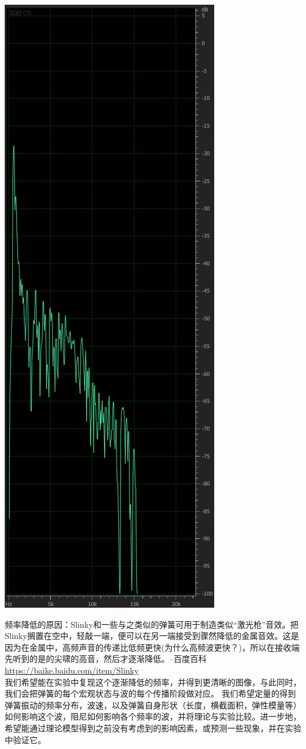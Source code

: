 \documentclass[UTF8,9pt]{report}
\begin{document}
\begin{center}
        \includegraphics[scale=0.4]{1_21.png}
    \end{center}
    频率降低的原因：Slinky和一些与之类似的弹簧可用于制造类似“激光枪”音效。把Slinky搁置在空中，轻敲一端，便可以在另一端接受到骤然降低的金属音效。这是因为在金属中，高频声音的传递比低频更快{\color{red}(为什么高频波更快？)}，所以在接收端先听到的是的尖啸的高音，然后才逐渐降低。--百度百科\url{https://baike.baidu.com/item/Slinky} \\
    我们希望能在实验中复现这个逐渐降低的频率，并得到更清晰的图像，与此同时，我们会把弹簧的每个宏观状态与波的每个传播阶段做对应。
    我们希望定量的得到弹簧振动的频率分布，波速，以及弹簧自身形状（长度，横截面积，弹性模量等）如何影响这个波，阻尼如何影响各个频率的波，并将理论与实验比较。进一步地，希望能通过理论模型得到之前没有考虑到的影响因素，或预测一些现象，并在实验中验证它。
\end{document}
